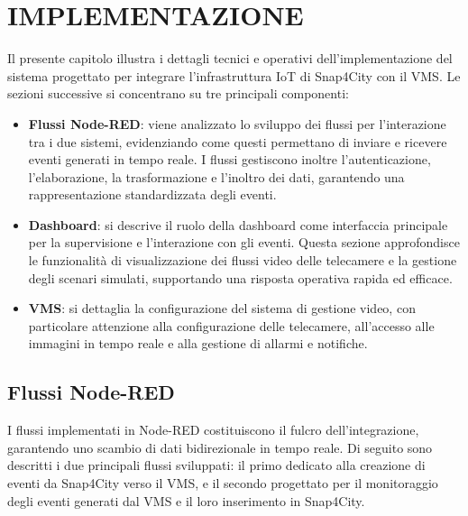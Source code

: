\documentclass[a4paper, openright, thesis]{report}
\begin{document}
\chapter{IMPLEMENTAZIONE}
Il presente capitolo illustra i dettagli tecnici e operativi dell'implementazione del sistema progettato per integrare l'infrastruttura IoT di Snap4City con il VMS.
Le sezioni successive si concentrano su tre principali componenti:
\begin{itemize}
      \item \textbf{Flussi Node-RED}: viene analizzato lo sviluppo dei flussi per l'interazione tra i due sistemi, evidenziando come questi permettano di inviare e ricevere eventi generati in tempo reale. I flussi gestiscono inoltre l'autenticazione, l'elaborazione, la trasformazione e l'inoltro dei dati, garantendo una rappresentazione standardizzata degli eventi.
    \item \textbf{Dashboard}: si descrive il ruolo della dashboard come interfaccia principale per la supervisione e l’interazione con gli eventi. Questa sezione approfondisce le funzionalità di visualizzazione dei flussi video delle telecamere e la gestione degli scenari simulati, supportando una risposta operativa rapida ed efficace.
    \item \textbf{VMS}: si dettaglia la configurazione del sistema di gestione video, con particolare attenzione alla configurazione delle telecamere, all'accesso alle immagini in tempo reale e alla gestione di allarmi e notifiche.
\end{itemize}

\section{Flussi Node-RED}
I flussi implementati in Node-RED costituiscono il fulcro dell’integrazione, garantendo uno scambio di dati bidirezionale in tempo reale.
Di seguito sono descritti i due principali flussi sviluppati: il primo dedicato alla creazione di eventi da Snap4City verso il VMS, e il secondo progettato per il monitoraggio degli eventi generati dal VMS e il loro inserimento in Snap4City.
\end{document}
